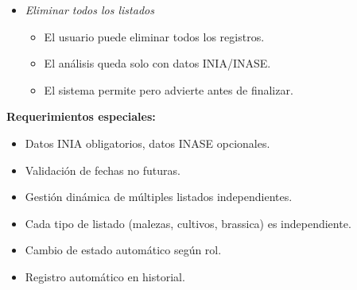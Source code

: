 \begin{itemize}[nosep]
    \item \textit{Eliminar todos los listados}
    \begin{itemize}[nosep]
        \item El usuario puede eliminar todos los registros.
        \item El análisis queda solo con datos INIA/INASE.
        \item El sistema permite pero advierte antes de finalizar.
    \end{itemize}
\end{itemize}

\vspace{0.5em}
\noindent\textbf{Requerimientos especiales:}
\begin{itemize}[nosep]
    \item Datos INIA obligatorios, datos INASE opcionales.
    \item Validación de fechas no futuras.
    \item Gestión dinámica de múltiples listados independientes.
    \item Cada tipo de listado (malezas, cultivos, brassica) es independiente.
    \item Cambio de estado automático según rol.
    \item Registro automático en historial.
\end{itemize}
